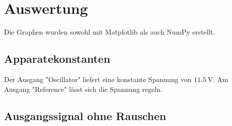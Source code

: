\section{Auswertung}
\label{sec:Auswertung}


Die Graphen wurden sowohl mit Matplotlib \cite{matplotlib} als auch NumPy \cite{numpy} erstellt.

\subsection{Apparatekonstanten}
\label{sec:Apparatekonstanten}
Der Ausgang "Oscillator" liefert eine konstante Spannung von $\SI{11,5}{\volt}$.
Am Ausgang "Reference" lässt sich die Spannung regeln.

\subsection{Ausgangssignal ohne Rauschen}
\label{sec:oR}
